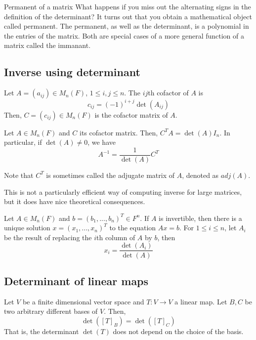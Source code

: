 \documentclass[11pt]{article}
\begin{document}
\begin{extension}{Permanent of a matrix}
  What happens if you miss out the alternating signs in the definition of the determinant? It turns out that you obtain a mathematical object called permanent. The permanent, as well as the determinant, is a polynomial in the entries of the matrix. Both are special cases of a more general function of a matrix called the immanant.
\end{extension}

\subsection{Inverse using determinant}
\begin{definition}[Cofactor]
  Let \(A=(a_{ij})\in M_n(F)\), \(1\leq i,j\leq n\). The \(ij\)th cofactor of \(A\) is
  \[c_{ij}=(-1)^{i+j}\det(A_{ij})\]
  Then, \(C=(c_{ij})\in M_n(F)\) is the cofactor matrix of \(A\). 
\end{definition}
\begin{theorem}
  Let \(A\in M_n(F)\) and \(C\) its cofactor matrix. Then, \(C^TA=\det(A)I_n\). In particular, if \(\det(A)\neq 0\), we have
  \[A^{-1}=\frac{1}{\det(A)}C^T\]
\end{theorem}
\begin{notation}
  Note that \(C^T\) is sometimes called the adjugate matrix of \(A\), denoted as \(adj(A)\).
\end{notation}
This is not a particularly efficient way of computing inverse for large matrices, but it does have nice theoretical consequences.

\begin{theorem}
  Let \(A\in M_n(F)\) and \(b=(b_1,...,b_n)^T\in F^n\). If \(A\) is invertible, then there is a unique solution \(x=(x_1,...,x_n)^T\) to the equation \(Ax=b\). For \(1\leq i\leq n\), let \(A_i\) be the result of replacing the \(i\)th column of \(A\) by \(b\), then
  \[x_i=\frac{\det(A_i)}{\det(A)}\]
\end{theorem}
\subsection{Determinant of linear maps}
\begin{theorem}
  Let \(V\) be a finite dimensional vector space and \(T:V\to V\) a linear map. Let \(B,C\) be two arbitrary different bases of \(V\). Then,
  \[\det([T]_B)=\det([T]_C)\]
  That is, the determinant \(\det(T)\) does not depend on the choice of the basis.
\end{theorem}
\end{document}
